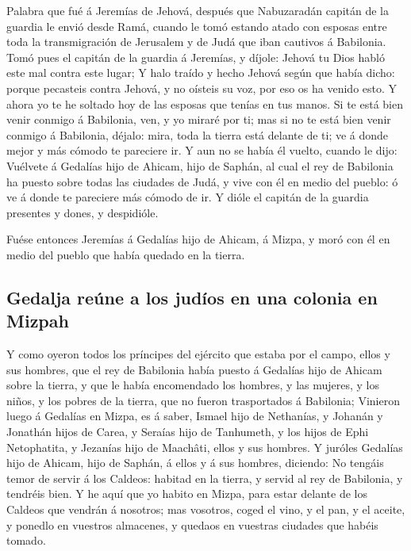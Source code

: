  Palabra que fué á Jeremías de Jehová, después que
Nabuzaradán capitán de la guardia le envió desde Ramá, cuando le tomó
estando atado con esposas entre toda la transmigración de Jerusalem y de
Judá que iban cautivos á Babilonia.  Tomó pues el capitán de
la guardia á Jeremías, y díjole: Jehová tu Dios habló este mal contra
este lugar;  Y halo traído y hecho Jehová según que había
dicho: porque pecasteis contra Jehová, y no oísteis su voz, por eso os
ha venido esto.  Y ahora yo te he soltado hoy de las esposas
que tenías en tus manos. Si te está bien venir conmigo á Babilonia, ven,
y yo miraré por ti; mas si no te está bien venir conmigo á Babilonia,
déjalo: mira, toda la tierra está delante de ti; ve á donde mejor y más
cómodo te pareciere ir.  Y aun no se había él vuelto, cuando
le dijo: Vuélvete á Gedalías hijo de Ahicam, hijo de Saphán, al cual el
rey de Babilonia ha puesto sobre todas las ciudades de Judá, y vive con
él en medio del pueblo: ó ve á donde te pareciere más cómodo de ir. Y
dióle el capitán de la guardia presentes y dones, y despidióle.

 Fuése entonces Jeremías á Gedalías hijo de Ahicam, á Mizpa,
y moró con él en medio del pueblo que había quedado en la tierra.

\hypertarget{gedalja-reuxfane-a-los-juduxedos-en-una-colonia-en-mizpah}{%
\subsection{Gedalja reúne a los judíos en una colonia en
Mizpah}\label{gedalja-reuxfane-a-los-juduxedos-en-una-colonia-en-mizpah}}

 Y como oyeron todos los príncipes del ejército que estaba
por el campo, ellos y sus hombres, que el rey de Babilonia había puesto
á Gedalías hijo de Ahicam sobre la tierra, y que le había encomendado
los hombres, y las mujeres, y los niños, y los pobres de la tierra, que
no fueron trasportados á Babilonia;  Vinieron luego á
Gedalías en Mizpa, es á saber, Ismael hijo de Nethanías, y Johanán y
Jonathán hijos de Carea, y Seraías hijo de Tanhumeth, y los hijos de
Ephi Netophatita, y Jezanías hijo de Maachâti, ellos y sus hombres.
 Y juróles Gedalías hijo de Ahicam, hijo de Saphán, á ellos
y á sus hombres, diciendo: No tengáis temor de servir á los Caldeos:
habitad en la tierra, y servid al rey de Babilonia, y tendréis bien.
 Y he aquí que yo habito en Mizpa, para estar delante de
los Caldeos que vendrán á nosotros; mas vosotros, coged el vino, y el
pan, y el aceite, y ponedlo en vuestros almacenes, y quedaos en vuestras
ciudades que habéis tomado.

